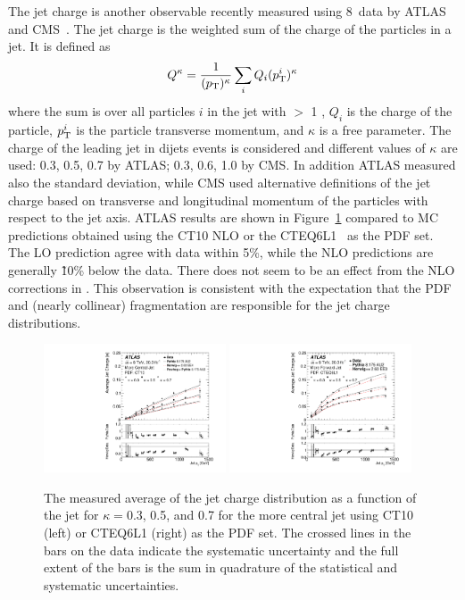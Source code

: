 \documentclass{PoS}
\begin{document}
The jet charge is another observable recently measured using 8~\TeV data by ATLAS~\cite{Aad:2015cua} and
CMS~\cite{CMS:2016yuu}. The jet charge is the \pt weighted sum of the charge of the particles in a
jet. It is defined as 
\begin{equation} \label{Omdef}
Q^\kappa = \frac{1}{(\pt)^\kappa} \sum_{i} Q_i (\pt^i)^\kappa
\end{equation}
where the sum is over all particles $i$ in the jet with \pt $>$ 1 \GeV, $Q_i$ is the charge of the particle, $p_{\mathrm{T}}^i$ is
the particle transverse momentum, and $\kappa$ is a free parameter. The charge of the leading jet in dijets events is
considered and different values of $\kappa$ are used: 0.3, 0.5, 0.7 by ATLAS; 0.3, 0.6, 1.0 by CMS. In addition ATLAS
measured also the standard deviation, while CMS used alternative definitions of the jet charge based on transverse and
longitudinal momentum of the particles with respect to the jet axis. ATLAS results are shown in
Figure~\ref{fig:jetcharge} compared to MC predictions obtained using the CT10 NLO or the
CTEQ6L1~\cite{Pumplin:2002vw} as the PDF set. The LO prediction agree with data within 5\%, while the NLO predictions are generally
\~10\% below the data. There does not seem to be an effect from the NLO corrections in \POWHEG.   
This observation is consistent with the expectation that the PDF and (nearly collinear) fragmentation
are responsible for the jet charge distributions.    
\begin{figure}[hbtp]
  \centering
  \includegraphics[width=0.48\textwidth]{Figure10a.pdf}
  \includegraphics[width=0.48\textwidth]{Figure10b.pdf}
  \caption{The measured average of the jet charge distribution as a function of the jet
    \pt for $\kappa=$0.3, 0.5, and 0.7 for the more central jet using CT10 (left) or CTEQ6L1 (right) as the PDF set. The crossed lines in the
    bars on the data indicate the systematic uncertainty and the full extent of the bars is the sum in quadrature of the
    statistical and systematic uncertainties. } 
  \label{fig:jetcharge}
\end{figure}
\end{document}
